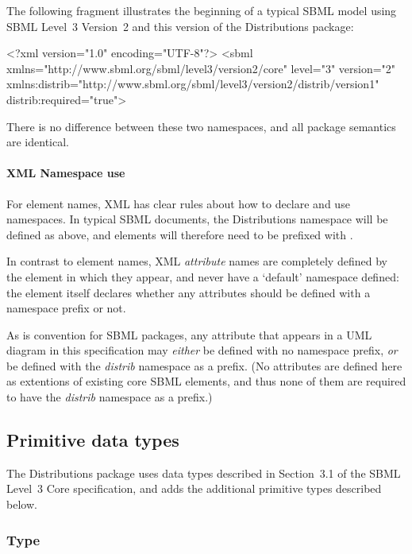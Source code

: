 \documentclass[draftspec]{sbmlpkgspec}
\newcommand{\fixttspace}{\hspace*{1pt}}
\newcommand{\sbmlthreecore}{SBML Level~3 Core\xspace}
\newcommand{\threetwo}{SBML Level~3 Version~2\xspace}
\newcommand{\distrib}{Distributions\xspace}
\begin{document}
The following fragment illustrates the beginning of a typical SBML model using \threetwo and this version of the \distrib package:

\begin{example}
<?xml version="1.0" encoding="UTF-8"?>
<sbml xmlns="http://www.sbml.org/sbml/level3/version2/core" level="3" version="2"
      xmlns:distrib="http://www.sbml.org/sbml/level3/version2/distrib/version1"
      distrib:required="true">
\end{example}

There is no difference between these two namespaces, and all package semantics are identical.

\paragraph{XML Namespace use}

For element names, XML has clear rules about how to declare and use namespaces.  In typical SBML documents, the \distrib namespace will be defined as above, and elements will therefore need to be prefixed with .

In contrast to element names, XML \emph{attribute} names are completely defined by the element in which they appear, and never have a `default' namespace defined:  the element itself declares whether any attributes should be defined with a namespace prefix or not.

As is convention for SBML packages, any attribute that appears in a UML diagram in this specification may \emph{either} be defined with no namespace prefix, \emph{or} be defined with the \emph{distrib} namespace as a prefix.  (No attributes are defined here as extentions of existing core SBML elements, and thus none of them are required to have the \emph{distrib} namespace as a prefix.)



\subsection{Primitive data types}
\label{new-primitive-types}

The \distrib package uses data types described in Section~3.1 of the \sbmlthreecore specification, and adds the additional primitive types described below.

\subsubsection{Type \fixttspace{}}
\label{sec:primtype-externalref}
\end{document}
